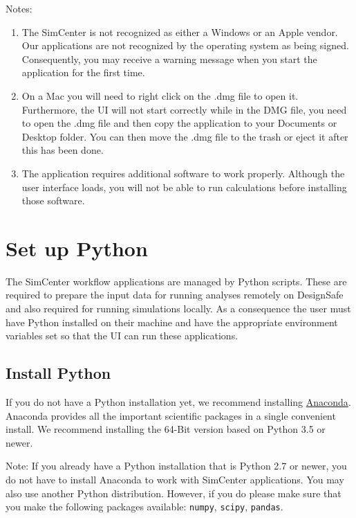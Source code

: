 Notes:
\begin{enumerate}
\item The SimCenter is not recognized as either a Windows or an Apple vendor. Our applications are not recognized by the operating system as being signed. Consequently, you may receive a warning message when you start the \texttt{\getsoftwarename{}} application for the first time.
\item  On a Mac you will need to right click on the .dmg file to open it. Furthermore, the UI will not start correctly while in the DMG file, you need to open the .dmg file and then copy the \texttt{\getsoftwarename{}} application to your Documents or Desktop folder. You can then move the .dmg file to the trash or eject it after this has been done.
\item  The \texttt{\getsoftwarename{}} application requires additional software to work properly. Although the user interface loads, you will not be able to run calculations before installing those software.
\end{enumerate}



\section{Set up Python}

The SimCenter workflow applications are managed by Python
scripts. These are required to prepare the input data for running
analyses remotely on DesignSafe and also required for running
simulations locally. As a consequence the user must have Python
installed on their machine and have the appropriate environment
variables set so that the UI can run these applications.

\subsection{Install Python}

If you do not have a Python installation yet, we recommend
installing \href{http://www.anaconda.com/distribution/#download-section}{Anaconda}. Anaconda
provides all the important scientific packages in a single convenient
install. We recommend installing the 64-Bit version based on Python
3.5 or newer.

Note: If you already have a Python installation that is Python 2.7 or
newer, you do not have to install Anaconda to work with SimCenter
applications. You may also use another Python distribution. However,
if you do please make sure that you make the following packages
available: \texttt{numpy}, \texttt{scipy}, \texttt{pandas}.

